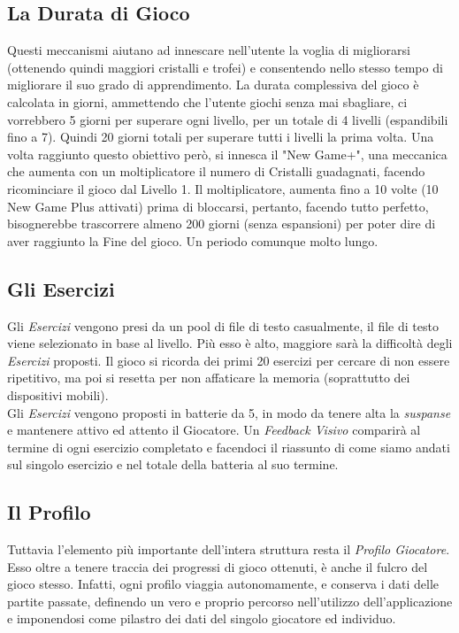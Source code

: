 \documentclass[14pt]{extbook}
\begin{document}
\subsection{La Durata di Gioco}
Questi meccanismi aiutano ad innescare nell'utente la voglia di migliorarsi (ottenendo quindi maggiori cristalli e trofei) e consentendo nello stesso tempo di migliorare il suo grado di apprendimento. La durata complessiva del gioco è calcolata in giorni, ammettendo che l'utente giochi senza mai sbagliare, ci vorrebbero 5 giorni per superare ogni livello, per un totale di 4 livelli (espandibili fino a 7). Quindi 20 giorni totali per superare tutti i livelli la prima volta. Una volta raggiunto questo obiettivo però, si innesca il "New Game+", una meccanica che aumenta con un moltiplicatore il numero di Cristalli guadagnati, facendo ricominciare il gioco dal Livello 1. Il moltiplicatore, aumenta fino a 10 volte (10 New Game Plus attivati) prima di bloccarsi, pertanto, facendo tutto perfetto, bisognerebbe trascorrere almeno 200 giorni (senza espansioni) per poter dire di aver raggiunto la Fine del gioco. Un periodo comunque molto lungo.\\

\subsection{Gli Esercizi}
Gli \textit{Esercizi} vengono presi da un pool di file di testo casualmente, il file di testo viene selezionato in base al livello. Più esso è alto, maggiore sarà la difficoltà degli \textit{Esercizi} proposti. Il gioco si ricorda dei primi 20 esercizi per cercare di non essere ripetitivo, ma poi si resetta per non affaticare la memoria (soprattutto dei dispositivi mobili).\\

Gli \textit{Esercizi} vengono proposti in batterie da 5, in modo da tenere alta la \textit{suspanse} e mantenere attivo ed attento il Giocatore. Un \textit{Feedback Visivo} comparirà al termine di ogni esercizio completato e facendoci il riassunto di come siamo andati sul singolo esercizio e nel totale della batteria al suo termine.\\

\subsection{Il Profilo}
Tuttavia l'elemento più importante dell'intera struttura resta il \textit{Profilo Giocatore}. Esso oltre a tenere traccia dei progressi di gioco ottenuti, è anche il fulcro del gioco stesso. Infatti, ogni profilo viaggia autonomamente, e conserva i dati delle partite passate, definendo un vero e proprio percorso nell'utilizzo dell'applicazione e imponendosi come pilastro dei dati del singolo giocatore ed individuo.\\
\end{document}
